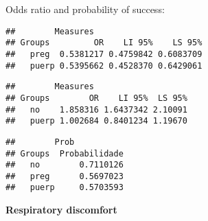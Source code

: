 \documentclass[
]{article}
\newenvironment{Shaded}{\begin{snugshade}}{\end{snugshade}}
\newcommand{\CommentTok}[1]{\textcolor[rgb]{0.56,0.35,0.01}{\textit{#1}}}
\newcommand{\KeywordTok}[1]{\textcolor[rgb]{0.13,0.29,0.53}{\textbf{#1}}}
\newcommand{\NormalTok}[1]{#1}
\newcommand{\OperatorTok}[1]{\textcolor[rgb]{0.81,0.36,0.00}{\textbf{#1}}}
\begin{document}
Odds ratio and probability of success:

\begin{Shaded}
\end{Shaded}

\begin{verbatim}
##        Measures
## Groups         OR    LI 95%    LS 95%
##   preg  0.5381217 0.4759842 0.6083709
##   puerp 0.5395662 0.4528370 0.6429061
\end{verbatim}

\begin{Shaded}
\end{Shaded}

\begin{verbatim}
##        Measures
## Groups        OR    LI 95%  LS 95%
##   no    1.858316 1.6437342 2.10091
##   puerp 1.002684 0.8401234 1.19670
\end{verbatim}

\begin{Shaded}
\end{Shaded}

\begin{verbatim}
##        Prob
## Groups  Probabilidade
##   no        0.7110126
##   preg      0.5697023
##   puerp     0.5703593
\end{verbatim}

\textbf{Respiratory discomfort}
\end{document}
